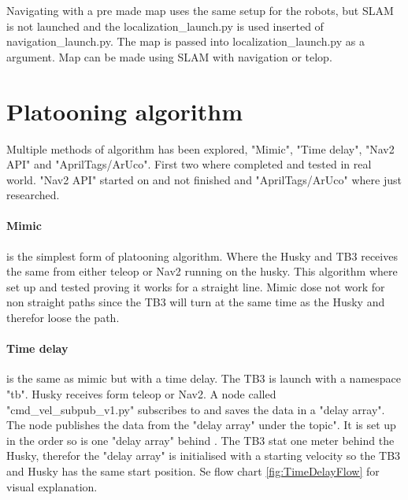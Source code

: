 Navigating with a pre made map uses the same setup for the robots, but SLAM is not launched and the localization\_launch.py is used inserted of navigation\_launch.py. The map is passed into localization\_launch.py as a argument. Map can be made using SLAM with navigation or telop. 

\section{Platooning algorithm} \label{Platooning_algorithm}
Multiple methods of algorithm has been explored, "Mimic", "Time delay", "Nav2 API" and "AprilTags/ArUco". First two where completed and tested in real world. "Nav2 API" started on and not finished and "AprilTags/ArUco" where just researched. 

\paragraph{Mimic} is the simplest form of platooning algorithm.  Where the Husky and TB3 receives the same  from either teleop or Nav2 running on the husky.  This algorithm where set up and tested proving it works for a straight line. Mimic dose not work for non straight paths since the TB3 will turn at the same time as the Husky and therefor loose the path.
   
\paragraph{Time delay} is the same as mimic but with a time delay. The TB3 is launch with a namespace "tb". Husky receives  form teleop or Nav2. A node called "cmd\_vel\_subpub\_v1.py" subscribes to  and saves the data in a "delay array". The node publishes the data from the "delay array" under the  topic". It is set up in the order so  is one "delay array" behind . The TB3 stat one meter behind the Husky, therefor the "delay array" is initialised with a starting velocity so the TB3 and Husky has the same start position. Se flow chart \ref{fig:TimeDelayFlow} for visual explanation.

